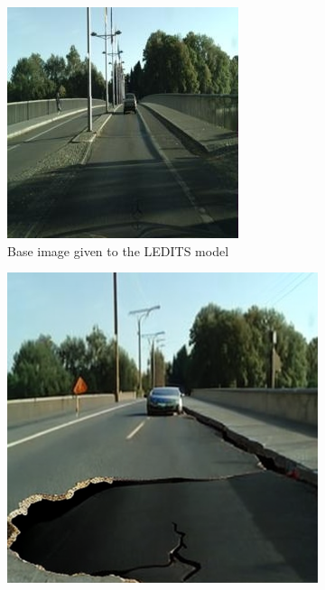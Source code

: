 \documentclass[letterpaper, 10 pt, conference]{ieeeconf}  %
\begin{document}
\begin{figure}
\centering
\begin{subfigure}{0.20\textwidth}
    \includegraphics[width=\textwidth]{base_road_image.jpg}
    \caption{Base image given to the LEDITS model}
    \label{ledits:base}
\end{subfigure}
\hfill
\begin{subfigure}{0.20\textwidth}
    \includegraphics[width=\textwidth]{pothole_addition.png}

\end{subfigure}
\end{figure}
\end{document}
